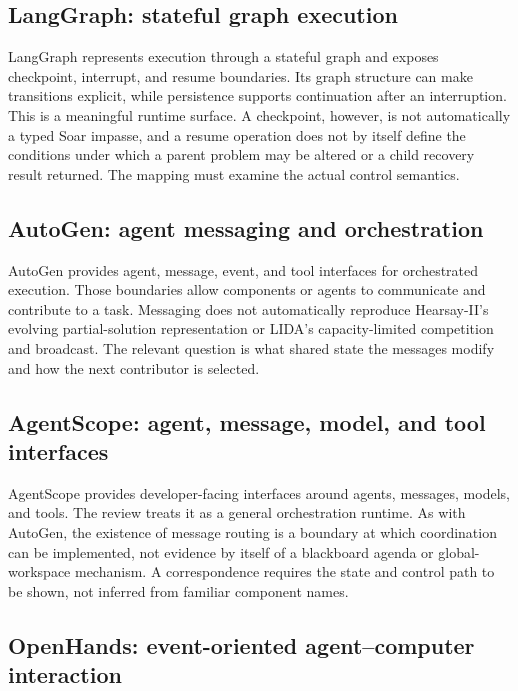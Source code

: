 \subsection{LangGraph: stateful graph execution}

LangGraph represents execution through a stateful graph and exposes checkpoint, interrupt, and resume boundaries. Its graph structure can make transitions explicit, while persistence supports continuation after an interruption. This is a meaningful runtime surface. A checkpoint, however, is not automatically a typed Soar impasse, and a resume operation does not by itself define the conditions under which a parent problem may be altered or a child recovery result returned. The mapping must examine the actual control semantics.

\subsection{AutoGen: agent messaging and orchestration}

AutoGen provides agent, message, event, and tool interfaces for orchestrated execution. Those boundaries allow components or agents to communicate and contribute to a task. Messaging does not automatically reproduce Hearsay-II's evolving partial-solution representation or LIDA's capacity-limited competition and broadcast. The relevant question is what shared state the messages modify and how the next contributor is selected.

\subsection{AgentScope: agent, message, model, and tool interfaces}

AgentScope provides developer-facing interfaces around agents, messages, models, and tools. The review treats it as a general orchestration runtime. As with AutoGen, the existence of message routing is a boundary at which coordination can be implemented, not evidence by itself of a blackboard agenda or global-workspace mechanism. A correspondence requires the state and control path to be shown, not inferred from familiar component names.

\subsection{OpenHands: event-oriented agent--computer interaction}


